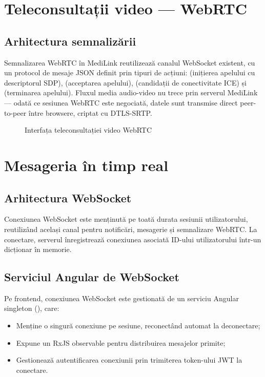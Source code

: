 \section{Teleconsultații video — WebRTC}

\subsection{Arhitectura semnalizării}

Semnalizarea WebRTC în MediLink reutilizează canalul WebSocket existent, cu un protocol de mesaje JSON definit prin tipuri de acțiuni:  (inițierea apelului cu descriptorul SDP),  (acceptarea apelului),  (candidații de conectivitate ICE) și  (terminarea apelului). Fluxul media audio-video nu trece prin serverul MediLink — odată ce sesiunea WebRTC este negociată, datele sunt transmise direct peer-to-peer între browsere, criptat cu DTLS-SRTP.

\begin{figure}[H]
  \centering
  \caption{Interfața teleconsultației video WebRTC}
  \label{fig:teleconsultatie}
\end{figure}

\section{Mesageria în timp real}

\subsection{Arhitectura WebSocket}

Conexiunea WebSocket este menținută pe toată durata sesiunii utilizatorului, reutilizând același canal pentru notificări, mesagerie și semnalizare WebRTC. La conectare, serverul înregistrează conexiunea asociată ID-ului utilizatorului într-un dicționar în memorie.

\subsection{Serviciul Angular de WebSocket}

Pe frontend, conexiunea WebSocket este gestionată de un serviciu Angular singleton (), care:
\begin{itemize}
  \item Menține o singură conexiune pe sesiune, reconectând automat la deconectare;
  \item Expune un  RxJS observable pentru distribuirea mesajelor primite;
  \item Gestionează autentificarea conexiunii prin trimiterea token-ului JWT la conectare.
\end{itemize}

